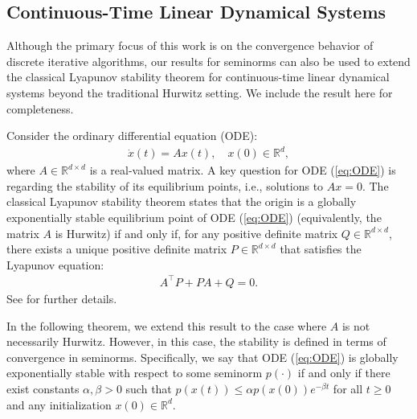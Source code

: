 \documentclass[11 pt]{article}
\begin{document}
	
	\subsection{Continuous-Time Linear Dynamical Systems} Although the primary focus of this work is on the convergence behavior of discrete iterative algorithms, our results for seminorms can also be used to extend the classical Lyapunov stability theorem for continuous-time linear dynamical systems beyond the traditional Hurwitz setting. We include the result here for completeness. 
	
	Consider the ordinary differential equation (ODE):  
	\begin{align}\label{eq:ODE}  
		\dot{x}(t) = Ax(t), \quad x(0) \in \mathbb{R}^d,  
	\end{align}  
	where $A \in \mathbb{R}^{d \times d}$ is a real-valued matrix. A key question for ODE (\ref{eq:ODE}) is regarding the stability of its equilibrium points, i.e., solutions to $Ax=0$. The classical Lyapunov stability theorem states that the origin is a globally exponentially stable equilibrium point of ODE (\ref{eq:ODE}) (equivalently, the matrix $A$ is Hurwitz) if and only if, for any positive definite matrix $Q \in \mathbb{R}^{d \times d}$, there exists a unique positive definite matrix $P\in \mathbb{R}^{d \times d}$ that satisfies the Lyapunov equation: 
	\begin{align}\label{eq:Lyapunov_Continuous}  
		A^\top P + PA + Q = 0.  
	\end{align}  
	See \cite{khalil2002nonlinear,haddad2008nonlinear} for further details.
	
	In the following theorem, we extend this result to the case where $A$ is not necessarily Hurwitz. However, in this case, the stability is defined in terms of convergence in seminorms. Specifically, we say that ODE (\ref{eq:ODE}) is globally exponentially stable with respect to some seminorm $p(\cdot)$ if and only if there exist constants $\alpha,\beta>0$ such that $p(x(t))\leq \alpha p(x(0))e^{-\beta t}$ for all $t\geq 0$ and any initialization $x(0)\in\mathbb{R}^d$.
	
\end{document}
